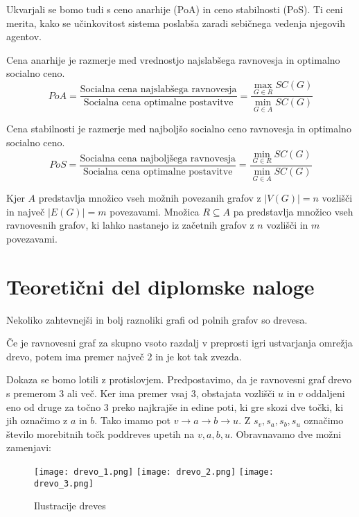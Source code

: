 \documentclass[fin1, tisk]{fmfdelo}
\begin{document}
Ukvarjali se bomo tudi s ceno anarhije (PoA) in ceno stabilnosti (PoS). Ti ceni merita, kako se učinkovitost sistema poslabša zaradi sebičnega vedenja njegovih agentov.

\begin{definicija}
Cena anarhije je razmerje med vrednostjo najslabšega ravnovesja in optimalno socialno ceno.
\[
PoA = \frac{\text{Socialna cena najslabšega ravnovesja}}{\text{Socialna cena optimalne postavitve}} = \frac{\max_{G\in R} SC(G)}{\min_{G\in A} SC(G)}
\]
\end{definicija}

\begin{definicija}
Cena stabilnosti je razmerje med najboljšo socialno ceno ravnovesja in optimalno socialno ceno.
\[
PoS = \frac{\text{Socialna cena najboljšega ravnovesja}}{\text{Socialna cena optimalne postavitve}} = \frac{\min_{G\in R} SC(G)}{\min_{G\in A} SC(G)}
\]
\end{definicija}

Kjer \(A\) predstavlja množico vseh možnih povezanih grafov z \( |V(G)| = n \) vozlišči in največ \( |E(G)| = m \) povezavami. Množica \(R \subseteq A\) pa predstavlja množico vseh ravnovesnih grafov, ki lahko nastanejo iz začetnih grafov z \(n\) vozlišči in \(m\) povezavami.

\section{Teoretični del diplomske naloge}

Nekoliko zahtevnejši in bolj raznoliki grafi od polnih grafov so drevesa.

\begin{izrek}
Če je ravnovesni graf za skupno vsoto razdalj v preprosti igri ustvarjanja omrežja drevo, potem ima premer največ 2 in je kot tak zvezda.
\end{izrek}

\begin{dokaz}
Dokaza se bomo lotili z protislovjem. Predpostavimo, da je ravnovesni graf drevo s premerom 3 ali več. Ker ima premer vsaj 3, obstajata vozlišči \(u\) in \(v\) oddaljeni eno od druge za točno 3 preko najkrajše in edine poti, ki gre skozi dve točki, ki jih označimo z \(a\) in \(b\). Tako imamo pot \(v \to a \to b \to u\). Z \(s_v, s_a, s_b, s_u\) označimo število morebitnih točk poddreves upetih na \(v, a, b, u\). Obravnavamo dve možni zamenjavi:
\end{dokaz}

\begin{figure}[h]
    \centering
    \texttt{[image: drevo\_1.png]}
    \texttt{[image: drevo\_2.png]}
    \texttt{[image: drevo\_3.png]}
    \caption{Ilustracije dreves}
\end{figure}
\end{document}
